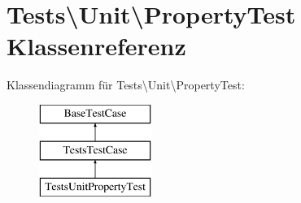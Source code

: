 \hypertarget{classTests_1_1Unit_1_1PropertyTest}{}\section{Tests\textbackslash{}Unit\textbackslash{}Property\+Test Klassenreferenz}
\label{classTests_1_1Unit_1_1PropertyTest}
Klassendiagramm für Tests\textbackslash{}Unit\textbackslash{}Property\+Test\+:\begin{figure}[H]
\begin{center}
\leavevmode
\includegraphics[height=3.000000cm]{df/dc5/classTests_1_1Unit_1_1PropertyTest}
\end{center}
\end{figure}
